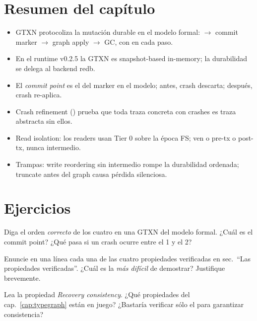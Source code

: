 \section{Resumen del capítulo}

\begin{itemize}
  \item GTXN protocoliza la mutación durable en el modelo formal:
    \wal{} $\to$ commit marker $\to$ graph apply $\to$ \wal{} GC, con
    \fsync{} en cada paso.
  \item En el runtime v0.2.5 la GTXN es snapshot-based in-memory;
    la durabilidad se delega al backend redb.
  \item El \emph{commit point} es el \fsync{} del marker en el modelo;
    antes, crash descarta; después, crash re-aplica.
  \item Crash refinement ()
    prueba que toda traza concreta con crashes es traza abstracta sin
    ellos.
  \item Read isolation: los readers usan Tier 0 \rcu{} sobre la época
    FS; ven o pre-tx o post-tx, nunca intermedio.
  \item Trampas: write reordering sin \fsync{} intermedio rompe la
    durabilidad ordenada; \wal{} truncate antes del graph \fsync{}
    causa pérdida silenciosa.
\end{itemize}

\section*{Ejercicios}

\begin{ejercicio}[\dificultad{$\star$}]
\label{ej:tx-1}
Diga el orden \emph{correcto} de los cuatro \fsync{} en una GTXN del
modelo formal. ¿Cuál es el commit point? ¿Qué pasa si un crash ocurre
entre el \fsync{} 1 y el \fsync{} 2?
\end{ejercicio}

\begin{ejercicio}[\dificultad{$\star$}]
\label{ej:tx-2}
Enuncie en una línea cada una de las cuatro propiedades verificadas en
sec.~``Las propiedades verificadas''. ¿Cuál es la \emph{más difícil} de
demostrar? Justifique brevemente.
\end{ejercicio}

\begin{ejercicio}[\dificultad{$\star\star$}]
\label{ej:tx-3}
Lea la propiedad \emph{Recovery consistency}. ¿Qué propiedades del
cap.~\ref{cap:typegraph} están en juego? ¿Bastaría verificar sólo el
 para garantizar consistencia?
\end{ejercicio}

